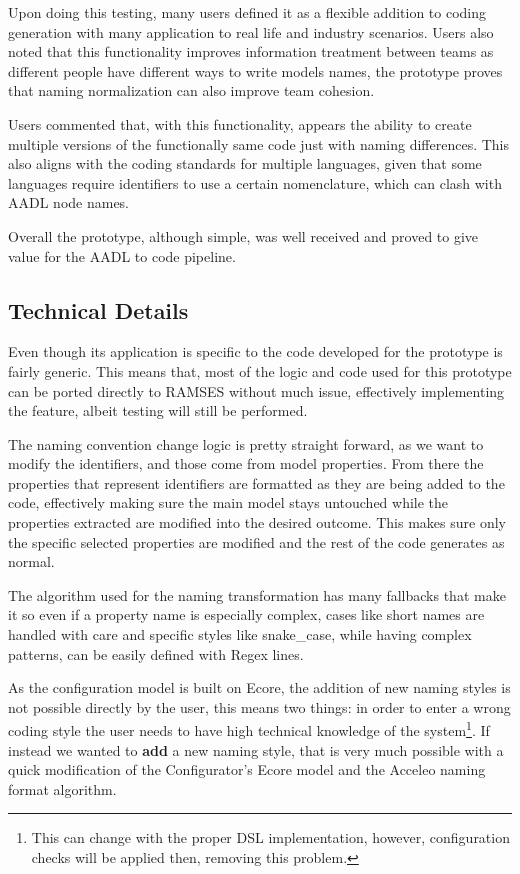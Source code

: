 Upon doing this testing, many users defined it as a flexible addition to coding generation with many application to real life and industry scenarios. Users also noted that this functionality improves information treatment between teams as different people have different ways to write models names, the prototype proves that naming normalization can also improve team cohesion.

Users commented that, with this functionality, appears the ability to create multiple versions of the functionally same code just with naming differences. This also aligns with the coding standards for multiple languages, given that some languages require identifiers to use a certain nomenclature, which can clash with AADL node names.

Overall the prototype, although simple, was well received and proved to give value for the AADL to code pipeline.

\subsection{Technical Details}
\label{sec:prototype_technical_details}

Even though its application is specific to the code developed for the prototype is fairly generic. This means that, most of the logic and code used for this prototype can be ported directly to RAMSES without much issue, effectively implementing the feature, albeit testing will still be performed.

The naming convention change logic is pretty straight forward, as we want to modify the identifiers, and those come from model properties. From there the properties that represent identifiers are formatted as they are being added to the code, effectively making sure the main model stays untouched while the properties extracted are modified into the desired outcome. This makes sure only the specific selected properties are modified and the rest of the code generates as normal.

The algorithm used for the naming transformation has many fallbacks that make it so even if a property name is especially complex, cases like short names are handled with care and specific styles like snake\_case, while having complex patterns, can be easily defined with Regex lines. 

As the configuration model is built on Ecore, the addition of new naming styles is not possible directly by the user, this means two things: in order to enter a wrong coding style the user needs to have high technical knowledge of the system\footnote{This can change with the proper DSL implementation, however, configuration checks will be applied then, removing this problem.}. If instead we wanted to \textbf{add} a new naming style, that is very much possible with a quick modification of the Configurator's Ecore model and the Acceleo naming format algorithm.

